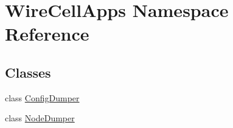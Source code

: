 \hypertarget{namespace_wire_cell_apps}{}\section{Wire\+Cell\+Apps Namespace Reference}
\label{namespace_wire_cell_apps}
\subsection*{Classes}
\begin{DoxyCompactItemize}
\item 
class \hyperlink{class_wire_cell_apps_1_1_config_dumper}{Config\+Dumper}
\item 
class \hyperlink{class_wire_cell_apps_1_1_node_dumper}{Node\+Dumper}
\end{DoxyCompactItemize}
